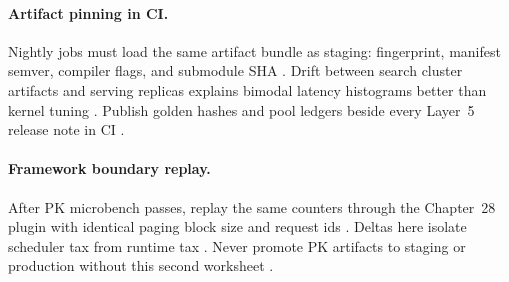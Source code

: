 \paragraph{Artifact pinning in CI.} Nightly jobs must load the same artifact bundle as staging: fingerprint, manifest semver, compiler flags, and submodule SHA \citep{yirage2026,chen2020compilerbasedhardw,patel2025llminference,taxbreak2026,memoryfloor2026,kwon2023vllm,liu2024deepseekv3,nvidia2024cudagraphs,dao2022flashattention,amd2024xdna,amd2024aie,dao2023flashdecoding,nvidia2022hopper,semianalysis2024tma,dlbook}. Drift between search cluster artifacts and serving replicas explains bimodal latency histograms better than kernel tuning \citep{patel2025llminference,yirage2026,chen2020compilerbasedhardw,kwon2023vllm,memoryfloor2026,taxbreak2026,liu2024deepseekv3,nvidia2024cudagraphs,dao2022flashattention,amd2024aie,amd2024xdna,dao2023flashdecoding,nvidia2022hopper,semianalysis2024tma,dlbook}. Publish golden hashes and pool ledgers beside every Layer~5 release note in CI \citep{yirage2026,chen2020compilerbasedhardw,patel2025llminference,dlbook,taxbreak2026,memoryfloor2026,kwon2023vllm,liu2024deepseekv3,nvidia2024cudagraphs,dao2022flashattention,amd2024aie,amd2024xdna,dao2023flashdecoding,nvidia2022hopper,semianalysis2024tma,dlbook}.

\paragraph{Framework boundary replay.} After PK microbench passes, replay the same counters through the Chapter~28 plugin with identical paging block size and request ids \citep{kwon2023vllm,yirage2026,chen2020compilerbasedhardw,patel2025llminference,taxbreak2026,memoryfloor2026,liu2024deepseekv3,nvidia2024cudagraphs,dao2022flashattention,amd2024xdna,amd2024aie,dao2023flashdecoding,nvidia2022hopper,semianalysis2024tma,dlbook}. Deltas here isolate scheduler tax from runtime tax \citep{patel2025llminference,kwon2023vllm,yirage2026,chen2020compilerbasedhardw,memoryfloor2026,taxbreak2026,liu2024deepseekv3,nvidia2024cudagraphs,dao2022flashattention,amd2024aie,amd2024xdna,dao2023flashdecoding,nvidia2022hopper,semianalysis2024tma,dlbook}. Never promote PK artifacts to staging or production without this second worksheet \citep{yirage2026,chen2020compilerbasedhardw,patel2025llminference,kwon2023vllm,taxbreak2026,memoryfloor2026,dlbook}.

